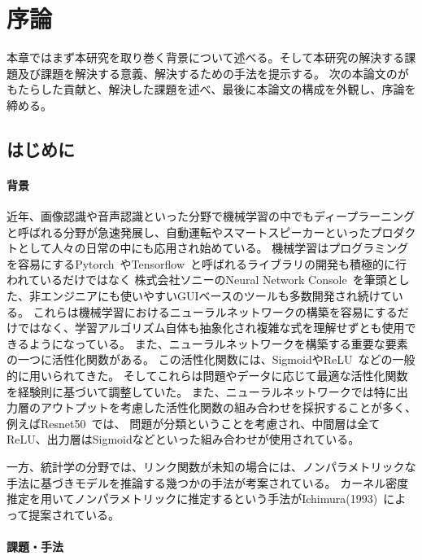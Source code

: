 \chapter{序論}
\label{introduction}

本章ではまず本研究を取り巻く背景について述べる。そして本研究の解決する課題及び課題を解決する意義、解決するための手法を提示する。
次の本論文のがもたらした貢献と、解決した課題を述べ、最後に本論文の構成を外観し、序論を締める。

\section{はじめに}
\label{introduction:background}

\subsubsection{背景}


近年、画像認識や音声認識といった分野で機械学習の中でもディープラーニングと呼ばれる分野が急速発展し、自動運転やスマートスピーカーといったプロダクトとして人々の日常の中にも応用され始めている。
機械学習はプログラミングを容易にするPytorch~\cite{pytorch}やTensorflow~\cite{tensorflow}と呼ばれるライブラリの開発も積極的に行われているだけではなく
株式会社ソニーのNeural Network Console~\cite{sony}を筆頭とした、非エンジニアにも使いやすいGUIベースのツールも多数開発され続けている。
これらは機械学習におけるニューラルネットワークの構築を容易にするだけではなく、学習アルゴリズム自体も抽象化され複雑な式を理解せずとも使用できるようになっている。
また、ニューラルネットワークを構築する重要な要素の一つに活性化関数がある。
この活性化関数には、SigmoidやReLU~\cite{ReLU}などの一般的に用いられてきた。
そしてこれらは問題やデータに応じて最適な活性化関数を経験則に基づいて調整していた。
また、ニューラルネットワークでは特に出力層のアウトプットを考慮した活性化関数の組み合わせを採択することが多く、例えばResnet50~\cite{resnet50}では、
問題が分類ということを考慮され、中間層は全てReLU、出力層はSigmoidなどといった組み合わせが使用されている。

一方、統計学の分野では、リンク関数が未知の場合には、ノンパラメトリックな手法に基づきモデルを推論する幾つかの手法が考案されている。
カーネル密度推定を用いてノンパラメトリックに推定するという手法がIchimura(1993)~\cite{ichimura}によって提案されている。

\subsubsection{課題・手法}

